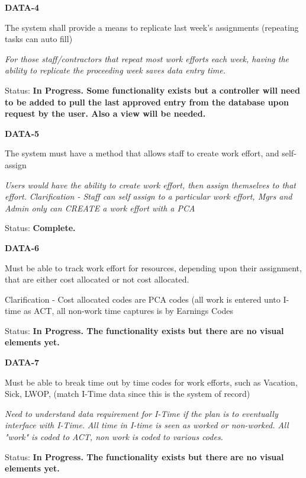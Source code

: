 \documentclass{article}
\begin{document}
\noindent \textbf{DATA-4}

\noindent The system shall provide a means to replicate last week's assignments (repeating tasks can auto fill)

\noindent \textit{For those staff/contractors that repeat most work efforts each week, having the ability to replicate the proceeding week saves data entry time.}

\noindent Status: \textbf{In Progress.  Some functionality exists but a controller will need to be added to pull the last approved entry from the database upon request by the user.  Also a view will be needed.}\textit{}

\noindent \textit{}


\noindent \textbf{DATA-5}

\noindent The system must have a method that allows staff to create work effort, and self-assign

\noindent \textit{Users would have the ability to create work effort, then assign themselves to that effort.} \textit{Clarification - Staff can self assign to a particular work effort, Mgrs and Admin only can CREATE a work effort with a PCA}

Status: \textbf{Complete.}\textit{}

\noindent \textit{}


\noindent \textbf{DATA-6}

\noindent Must be able to track work effort for resources, depending upon their assignment, that are either cost allocated or not cost allocated. 

\noindent Clarification - Cost allocated codes are PCA codes (all work is entered unto I-time as ACT, all non-work time captures is by Earnings Codes\textit{}

Status: \textbf{In Progress.  The functionality exists but there are no visual elements yet.}\textit{}

\noindent \textit{}


\noindent \textbf{DATA-7}

\noindent Must be able to break time out by time codes for work efforts, such as Vacation, Sick, LWOP, (match I-Time data since this is the system of record)

\noindent \textit{Need to understand data requirement for I-Time if the plan is to eventually interface with I-Time.} \textit{All time in I-time is seen as worked or non-worked.  All "work" is coded to ACT, non work is coded to various codes.}

\textit{ }Status: \textbf{In Progress.  The functionality exists but there are no visual elements yet.}
\end{document}
